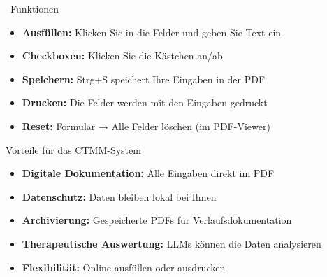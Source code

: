 \vspace{1cm}

\begin{ctmmYellowBox}{\faInfoCircle~Funktionen}
\begin{itemize}
    \item \textbf{Ausfüllen:} Klicken Sie in die Felder und geben Sie Text ein
    \item \textbf{Checkboxen:} Klicken Sie die Kästchen an/ab
    \item \textbf{Speichern:} Strg+S speichert Ihre Eingaben in der PDF
    \item \textbf{Drucken:} Die Felder werden mit den Eingaben gedruckt
    \item \textbf{Reset:} Formular → Alle Felder löschen (im PDF-Viewer)
\end{itemize}
\end{ctmmYellowBox}

\vspace{1cm}

\begin{ctmmGreenBox}{Vorteile für das CTMM-System}
\begin{itemize}
    \item \textbf{Digitale Dokumentation:} Alle Eingaben direkt im PDF
    \item \textbf{Datenschutz:} Daten bleiben lokal bei Ihnen
    \item \textbf{Archivierung:} Gespeicherte PDFs für Verlaufsdokumentation
    \item \textbf{Therapeutische Auswertung:} LLMs können die Daten analysieren
    \item \textbf{Flexibilität:} Online ausfüllen oder ausdrucken
\end{itemize}
\end{ctmmGreenBox}
